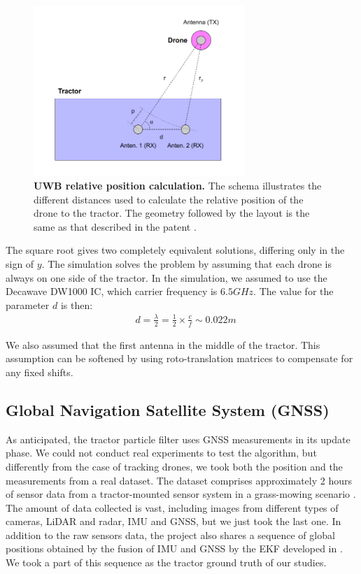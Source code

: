 \documentclass[letterpaper,twocolumn,10pt]{article}
\begin{document}
\begin{figure}[!htp]
    \centering
     \includegraphics[width=8cm]{images/uwb.png}
     \caption{\textbf{UWB relative position calculation.} The schema illustrates the different distances used to calculate the relative position of the drone to the tractor. The geometry followed by the layout is the same as that described in the patent \cite{patent}.}
    \label{fig:1}
\end{figure}

The square root gives two completely equivalent solutions, differing only in the sign of $y$. The simulation solves the problem by assuming that each drone is always on one side of the tractor. 
In the simulation, we assumed to use the Decawave DW1000 IC, which carrier frequency is $6.5 GHz$. The value for the parameter $d$ is then:
\begin{align*}
& d = \frac{\lambda}{2} = \frac{1}{2} \times \frac{c}{f} \sim 0.022 m
\end{align*}

We also assumed that the first antenna in the middle of the tractor. This assumption can be softened by using roto-translation matrices to compensate for any fixed shifts.


\subsection*{Global Navigation Satellite System (GNSS)}

As anticipated, the tractor particle filter uses GNSS measurements in its update phase. We could not conduct real experiments to test the algorithm, but differently from the case of tracking drones, we took both the position and the measurements from a real dataset. The dataset comprises approximately 2 hours of sensor data from a tractor-mounted sensor system in a grass-mowing scenario \cite{s17112579}.
The amount of data collected is vast, including images from different types of cameras, LiDAR and radar, IMU and GNSS,
but we just took the last one. In addition to the raw sensors data, the project also shares a sequence of global positions obtained by the fusion of IMU and GNSS by the  EKF developed in \cite{10.1007/978-3-319-08338-4_25}. We took a part of this sequence as the tractor ground truth of our studies.
\end{document}
